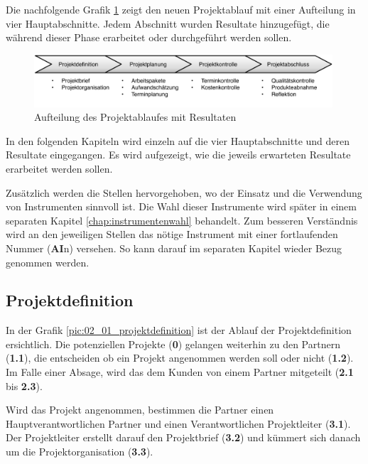 Die nachfolgende Grafik \ref{pic:01_projektablauf} zeigt den neuen Projektablauf 
mit einer Aufteilung in vier Hauptabschnitte. Jedem Abschnitt wurden Resultate
hinzugefügt, die während dieser Phase erarbeitet oder durchgeführt werden sollen.

\begin{figure}[htbp]
\begin{center}
\includegraphics[width=0.99\textwidth,angle=0]{./bilder/loesung/01_projektablauf.pdf}
\caption[Aufteilung des Projektablaufes mit Resultaten]{Aufteilung des Projektablaufes mit Resultaten\footnotemark}
\label{pic:01_projektablauf}
\end{center}
\end{figure}

In den folgenden Kapiteln wird einzeln auf die vier Hauptabschnitte und deren
Resultate eingegangen. Es wird aufgezeigt, wie die jeweils erwarteten Resultate 
erarbeitet werden sollen.

Zusätzlich werden die Stellen hervorgehoben, wo der Einsatz und die Verwendung 
von Instrumenten sinnvoll ist. Die Wahl dieser Instrumente wird später in einem
separaten Kapitel \ref{chap:instrumentenwahl} behandelt. Zum besseren Verständnis
wird an den jeweiligen Stellen das nötige Instrument mit einer fortlaufenden
Nummer (\textbf{AI}n) versehen. So kann darauf im separaten Kapitel wieder Bezug 
genommen werden.

\subsection{Projektdefinition}
In der Grafik \ref{pic:02_01_projektdefinition} ist der Ablauf der Projektdefinition 
ersichtlich. Die potenziellen Projekte (\textbf{0}) gelangen weiterhin zu den
Partnern (\textbf{1.1}), die entscheiden ob ein Projekt angenommen werden soll
oder nicht (\textbf{1.2}). Im Falle einer Absage, wird das dem Kunden von einem
Partner mitgeteilt (\textbf{2.1} bis \textbf{2.3}).

Wird das Projekt angenommen, bestimmen die Partner einen Hauptverantwortlichen
Partner und einen Verantwortlichen Projektleiter (\textbf{3.1}). Der Projektleiter
erstellt darauf den Projektbrief (\textbf{3.2}) und kümmert sich danach um
die Projektorganisation (\textbf{3.3}).

